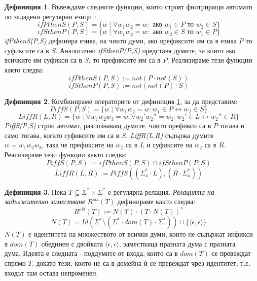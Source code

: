 \documentclass[12pt, oneside]{article}
\theoremstyle{definition}
\newtheorem{definition}{Дефиниция}[section]
\begin{document}
\begin{definition}\label{def:defIfPThenS}
	Въвеждаме следните функции, които строят филтриращи автомати по зададени регулярни езици \cite{Kaplan&Kay:94}:
	\[ ifPthenS(P,S) = \{ w \mid \forall w_1w_2 = w: \text{ ако } w_1 \in P \text{ то } w_2 \in S \} \]
	\[ ifSthenP(P,S) = \{ w \mid \forall w_1w_2 = w: \text{ ако } w_2 \in S \text{ то } w_1 \in P \} \]
	\emph{ifPthenS(P,S)} дефинира езика, на чиито думи, ако префиксите им са в езика \(P\) то суфиксите са в \(S\). Аналогично \emph{ifSthenP(P,S)} представя думите, за които ако всичките им суфикси са в \(S\), то префиксите им са в \(P\). Реализираме тези функции както следва:
	\[ ifPthenS(P,S) := not(P \cdot not(S)) \]
	\[ ifSthenP(P,S) := not(not(P) \cdot S) \]	
\end{definition}

\begin{definition}
	Комбинираме операторите от дефиниция \ref{def:defIfPThenS}, за да представим:
	\[ PiffS(P,S) = \{ w \mid \forall w_1w_2 = w: w_1 \in P \leftrightarrow w_2 \in S \} \]
	\[ LiffR(L,R) = \{ w \mid \forall w_1w_2w_3 = w: \forall w_2'w_2'' = w_2: w_2' \in L \leftrightarrow w_2'' \in R \} \]
	\emph{PiffS(P,S)} строи автомат, разпознаващ думите, чиито префикси са в \(P\) тогава и само тогава, когато суфиксите им са в \(S\). \emph{LiffR(L,R)} съдържа думите \( w = w_1w_2w_3 \), така че префиксите на \(w_2\) са в \(L\) и суфиксите на \(w_2\) са в \(R\). Реализираме тези функции както следва:
	\[ PiffS(P,S) := ifPthenS(P,S) \cap ifSthenP(P,S) \]
	\[ LiffR(L,R) := PiffS((\Sigma_x^* \cdot L), (R \cdot \Sigma_x^*)) \]	
\end{definition}

\begin{definition}\label{def:Robl}
	Нека \(T \subseteq \Sigma^* \times \Sigma^* \) е регулярна релация. \emph{Релацията на задължително заместване} \(R^{obl}(T)\) дефинираме както следва:
	\[ R^{obl}(T) := N(T) \cdot (T \cdot N(T))^* \]
	\[ N(T) = Id(\Sigma^* \setminus (\Sigma^* \cdot dom(T) \cdot \Sigma^*)) \cup \{ \langle \epsilon, \epsilon \rangle \} \]
	\(N(T)\) е идентитета на множеството от всички думи, които не съдържат инфикси в \(dom(T)\) обединен с двойката \(\langle \epsilon, \epsilon \rangle\), заместваща празната дума с празната дума.
	Идеята е следната - поддумите от входа, които са в \(dom(T)\) се превеждат спрямо \(T\), докато тези, които не са в домейна ѝ се превеждат чрез идентитет, т.е. входът там остава непроменен.
\end{definition}
\end{document}

